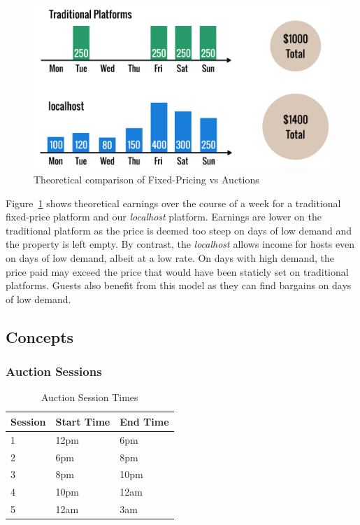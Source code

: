 \begin{figure}[!h]
  \includegraphics[width=\linewidth]{assets/fixedvsdynamic.png}
  \caption{Theoretical comparison of Fixed-Pricing vs Auctions}
  \label{fig:fixedVsDynamic}
\end{figure}

Figure~\ref{fig:fixedVsDynamic} shows theoretical earnings over the course of
a week for a traditional fixed-price platform and our \emph{localhost} platform.
Earnings are lower on the traditional platform as the price is deemed too steep
on days of low demand and the property is left empty.
By contrast, the \emph{localhost} allows income for hosts even on days of low demand, albeit
at a low rate. On days with high demand, the price paid may exceed the price that would
have been staticly set on traditional platforms. Guests also benefit from this model
as they can find bargains on days of low demand.

\subsection{Concepts}

\subsubsection{Auction Sessions}

\begin{table}[!h]
  \centering
  \begin{tabular}{|l|l|l|}
    \hline
    Session & Start Time & End Time \\ \hline
    1       & 12pm       & 6pm      \\
    2       & 6pm        & 8pm      \\
    3       & 8pm        & 10pm     \\
    4       & 10pm       & 12am     \\
    5       & 12am       & 3am      \\ \hline
  \end{tabular}
  \caption{Auction Session Times}
  \label{tab:sessionTimes}
\end{table}

